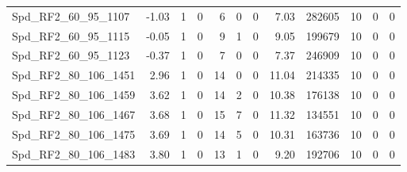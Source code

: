 \begin{longtable}[c]{@{}lrrrrrrrrrrr@{}}
Spd\_RF2\_60\_95\_1107       & -1.03                  & 1                       & 0                       & 6                      & 0                       & 0                       & 7.03                    & 282605                   & 10                       & 0                        & 0                        \\
Spd\_RF2\_60\_95\_1115       & -0.05                  & 1                       & 0                       & 9                      & 1                       & 0                       & 9.05                    & 199679                   & 10                       & 0                        & 0                        \\
Spd\_RF2\_60\_95\_1123       & -0.37                  & 1                       & 0                       & 7                      & 0                       & 0                       & 7.37                    & 246909                   & 10                       & 0                        & 0                        \\
Spd\_RF2\_80\_106\_1451      & 2.96                   & 1                       & 0                       & 14                     & 0                       & 0                       & 11.04                   & 214335                   & 10                       & 0                        & 0                        \\
Spd\_RF2\_80\_106\_1459      & 3.62                   & 1                       & 0                       & 14                     & 2                       & 0                       & 10.38                   & 176138                   & 10                       & 0                        & 0                        \\
Spd\_RF2\_80\_106\_1467      & 3.68                   & 1                       & 0                       & 15                     & 7                       & 0                       & 11.32                   & 134551                   & 10                       & 0                        & 0                        \\
Spd\_RF2\_80\_106\_1475      & 3.69                   & 1                       & 0                       & 14                     & 5                       & 0                       & 10.31                   & 163736                   & 10                       & 0                        & 0                        \\
Spd\_RF2\_80\_106\_1483      & 3.80                   & 1                       & 0                       & 13                     & 1                       & 0                       & 9.20                    & 192706                   & 10                       & 0                        & 0                        \\

\end{longtable}
